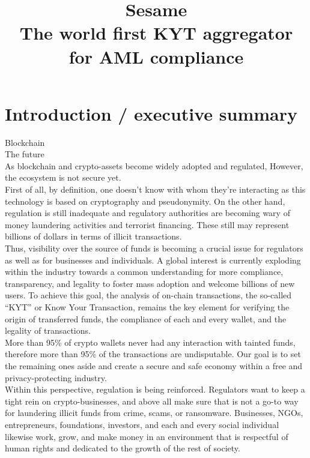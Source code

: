 ﻿\documentclass[a4paper]{article}
\begin{document}
\title{Sesame \vspace{10pt} \\
\large The world first KYT aggregator for AML compliance}
\maketitle
\section{Introduction / executive summary}
Blockchain  \\
The future \\
As blockchain and crypto-assets become widely adopted and regulated, 
However, the ecosystem is not secure yet. \\

First of all, by definition, one doesn’t know with whom they’re interacting as this technology is based on cryptography and pseudonymity. On the other hand, regulation is still inadequate and regulatory authorities are becoming wary of money laundering activities and terrorist financing. These still may represent billions of dollars in terms of illicit transactions. \\

Thus, visibility over the source of funds is becoming a crucial issue for regulators as well as for businesses and individuals. A global interest is currently exploding within the industry towards a common understanding for more compliance, transparency, and legality to foster mass adoption and welcome billions of new users. 
To achieve this goal, the analysis of on-chain transactions, the so-called “KYT” or Know Your Transaction,  remains the key element for verifying the origin of transferred funds, the compliance of each and every wallet, and the legality of transactions. \\

More than 95\% of crypto wallets never had any interaction with tainted funds, therefore more than 95\% of the transactions are undisputable. Our goal is to set the remaining ones aside and create a secure and safe economy within a free and privacy-protecting industry. \\

Within this perspective, regulation is being reinforced. Regulators want to keep a tight rein on crypto-businesses, and above all make sure that is not a go-to way for laundering illicit funds from crime, scams, or ransomware. Businesses, NGOs, entrepreneurs, foundations, investors, and each and every social individual likewise work, grow, and make money in an environment that is respectful of human rights and dedicated to the growth of the rest of society.
\end{document}
